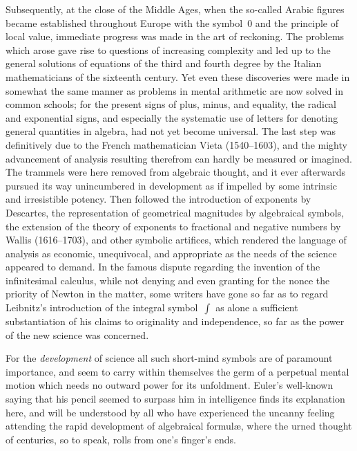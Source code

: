 \documentclass[12pt]{book}[2005/09/16]
\newcommand{\PageSep}[1]{\ignorespaces}
\begin{document}
Subsequently, at the close of the Middle Ages, when the so-called
Arabic figures became established throughout Europe with
the symbol~$0$ and the principle of local value, immediate progress
was made in the art of reckoning. The problems which arose
gave rise to questions of increasing complexity and led up to the
general solutions of equations of the third and fourth degree by
the Italian mathematicians of the sixteenth century. Yet even
these discoveries were made in somewhat the same manner as
problems in mental arithmetic are now solved in common schools;
for the present signs of plus, minus, and equality, the radical and
exponential signs, and especially the systematic use of letters for
denoting general quantities in algebra, had not yet become universal.
The last step was definitively due to the French mathematician
Vieta (1540--1603), and the mighty advancement of analysis
%
resulting therefrom can hardly be measured or imagined. The
trammels were here removed from algebraic thought, and it ever
afterwards pursued its way unincumbered in development as if impelled
by some intrinsic and irresistible potency. Then followed
the introduction of exponents by Descartes, the representation of
%
geometrical magnitudes by algebraical symbols, the extension of
the theory of exponents to fractional and negative numbers by
Wallis (1616--1703), and other symbolic artifices, which rendered
%
the language of analysis as economic, unequivocal, and appropriate
as the needs of the science appeared to demand. In the famous
dispute regarding the invention of the infinitesimal calculus, while
not denying and even granting for the nonce the priority of Newton
%
in the matter, some writers have gone so far as to regard Leibnitz's
%
introduction of the integral symbol~$\int$ as alone a sufficient substantiation
of his claims to originality and independence, so far as the
power of the new science was concerned.

For the \emph{development} of science all such short-mind symbols
are of paramount importance, and seem to carry within themselves
the germ of a perpetual mental motion which needs no outward
power for its unfoldment. Euler's well-known saying that his
%
\PageSep{ix}
pencil seemed to surpass him in intelligence finds its explanation
here, and will be understood by all who have experienced the uncanny
feeling attending the rapid development of algebraical formulæ,
where the urned thought of centuries, so to speak, rolls from
one's finger's ends.
\end{document}
